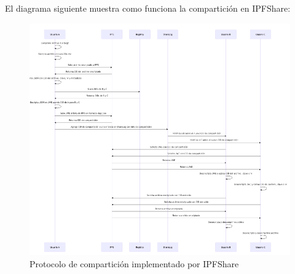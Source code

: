 El diagrama siguiente muestra como funciona la compartición en IPFShare:
\begin{figure}[H]
  \centering
  \includegraphics[width=\textwidth]{images/protocoloIpfshare.png}
  \caption{Protocolo de compartición implementado por IPFShare}
  \label{fig:ipfshareprotocol}
\end{figure}

